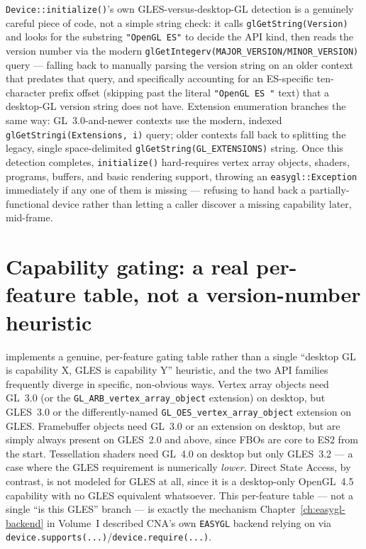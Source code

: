 \texttt{Device::initialize()}'s own GLES-versus-desktop-GL detection is a genuinely careful
piece of code, not a simple string check: it calls \texttt{glGetString(Version)} and looks
for the substring \texttt{"OpenGL ES"} to decide the API kind, then reads the version number
via the modern \texttt{glGetIntegerv(MAJOR\_VERSION/MINOR\_VERSION)} query --- falling back to
manually parsing the version string on an older context that predates that query, and
specifically accounting for an ES-specific ten-character prefix offset (skipping past the
literal \texttt{"OpenGL ES "} text) that a desktop-GL version string does not have. Extension
enumeration branches the same way: GL~3.0-and-newer contexts use the modern, indexed
\texttt{glGetStringi(Extensions, i)} query; older contexts fall back to splitting the legacy,
single space-delimited \texttt{glGetString(GL\_EXTENSIONS)} string. Once this detection
completes, \texttt{initialize()} hard-requires vertex array objects, shaders, programs,
buffers, and basic rendering support, throwing an \texttt{easygl::Exception} immediately if
any one of them is missing --- refusing to hand back a partially-functional device rather
than letting a caller discover a missing capability later, mid-frame.

\section{Capability gating: a real per-feature table, not a version-number heuristic}

 implements a genuine,
per-feature gating table rather than a single ``desktop GL is capability X, GLES is capability
Y'' heuristic, and the two API families frequently diverge in specific, non-obvious ways.
Vertex array objects need GL~3.0 (or the \texttt{GL\_ARB\_vertex\_array\_object} extension) on
desktop, but GLES~3.0 or the differently-named \texttt{GL\_OES\_vertex\_array\_object}
extension on GLES. Framebuffer objects need GL~3.0 or an extension on desktop, but are simply
always present on GLES~2.0 and above, since FBOs are core to ES2 from the start. Tessellation
shaders need GL~4.0 on desktop but only GLES~3.2 --- a case where the GLES requirement is
numerically \emph{lower}. Direct State Access, by contrast, is not modeled for GLES at all,
since it is a desktop-only OpenGL~4.5 capability with no GLES equivalent whatsoever. This
per-feature table --- not a single ``is this GLES'' branch --- is exactly the mechanism
Chapter~\ref{ch:easygl-backend} in Volume~I described CNA's own \texttt{EASYGL} backend
relying on via \texttt{device.supports(...)}/\texttt{device.require(...)}.

